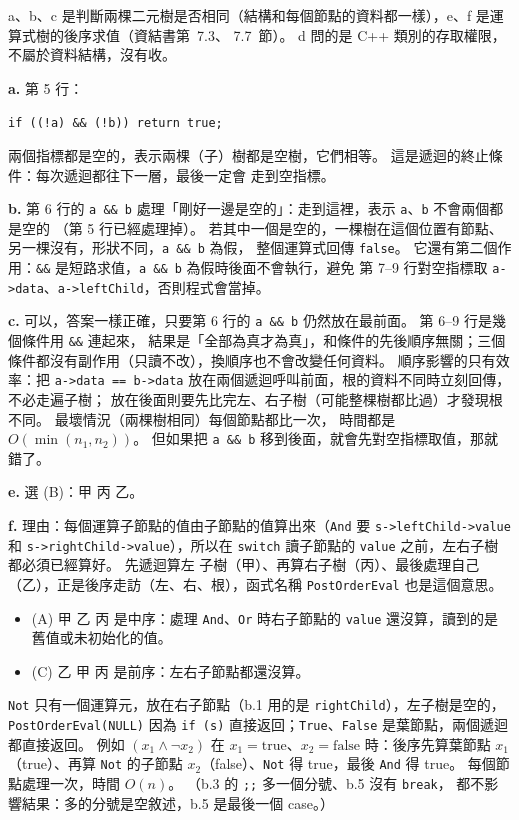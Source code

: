 \begin{pastsoln}
a、b、c 是判斷兩棵二元樹是否相同（結構和每個節點的資料都一樣），e、f 是運算式樹的後序求值（資結書第~7.3、
7.7~節）。 d 問的是 C++ 類別的存取權限，不屬於資料結構，沒有收。

\textbf{a.} 第 5 行：
\begin{center}
\texttt{if ((!a) \&\& (!b)) return true;}
\end{center}
兩個指標都是空的，表示兩棵（子）樹都是空樹，它們相等。 這是遞迴的終止條件：每次遞迴都往下一層，最後一定會
走到空指標。

\textbf{b.} 第 6 行的 \texttt{a \&\& b} 處理「剛好一邊是空的」：走到這裡，表示 \texttt{a}、\texttt{b} 不會兩個都是空的
（第 5 行已經處理掉）。 若其中一個是空的，一棵樹在這個位置有節點、另一棵沒有，形狀不同，\texttt{a \&\& b} 為假，
整個運算式回傳 \texttt{false}。 它還有第二個作用：\texttt{\&\&} 是短路求值，\texttt{a \&\& b} 為假時後面不會執行，避免
第 7--9 行對空指標取 \texttt{a->data}、\texttt{a->leftChild}，否則程式會當掉。

\textbf{c.} 可以，答案一樣正確，只要第 6 行的 \texttt{a \&\& b} 仍然放在最前面。 第 6--9 行是幾個條件用 \texttt{\&\&} 連起來，
結果是「全部為真才為真」，和條件的先後順序無關；三個條件都沒有副作用（只讀不改），換順序也不會改變任何資料。
順序影響的只有效率：把 \texttt{a->data == b->data} 放在兩個遞迴呼叫前面，根的資料不同時立刻回傳，不必走遍子樹；
放在後面則要先比完左、右子樹（可能整棵樹都比過）才發現根不同。 最壞情況（兩棵樹相同）每個節點都比一次，
時間都是 $O(\min(n_1, n_2))$。 但如果把 \texttt{a \&\& b} 移到後面，就會先對空指標取值，那就錯了。

\textbf{e.} 選 (B)：甲 丙 乙。

\textbf{f.} 理由：每個運算子節點的值由子節點的值算出來（\texttt{And} 要 \texttt{s->leftChild->value} 和
\texttt{s->rightChild->value}），所以在 \texttt{switch} 讀子節點的 \texttt{value} 之前，左右子樹都必須已經算好。 先遞迴算左
子樹（甲）、再算右子樹（丙）、最後處理自己（乙），正是後序走訪（左、右、根），函式名稱 \texttt{PostOrderEval}
也是這個意思。
\begin{itemize}
\item (A) 甲 乙 丙 是中序：處理 \texttt{And}、\texttt{Or} 時右子節點的 \texttt{value} 還沒算，讀到的是舊值或未初始化的值。
\item (C) 乙 甲 丙 是前序：左右子節點都還沒算。
\end{itemize}
\texttt{Not} 只有一個運算元，放在右子節點（b.1 用的是 \texttt{rightChild}），左子樹是空的，\texttt{PostOrderEval(NULL)} 因為
\texttt{if (s)} 直接返回；\texttt{True}、\texttt{False} 是葉節點，兩個遞迴都直接返回。 例如 $(x_1 \wedge \neg x_2)$ 在
$x_1 = \text{true}$、$x_2 = \text{false}$ 時：後序先算葉節點 $x_1$（true）、再算 \texttt{Not} 的子節點 $x_2$（false）、\texttt{Not}
得 true，最後 \texttt{And} 得 true。 每個節點處理一次，時間 $O(n)$。 （b.3 的 \texttt{;;} 多一個分號、b.5 沒有 \texttt{break}，
都不影響結果：多的分號是空敘述，b.5 是最後一個 case。）
\end{pastsoln}
